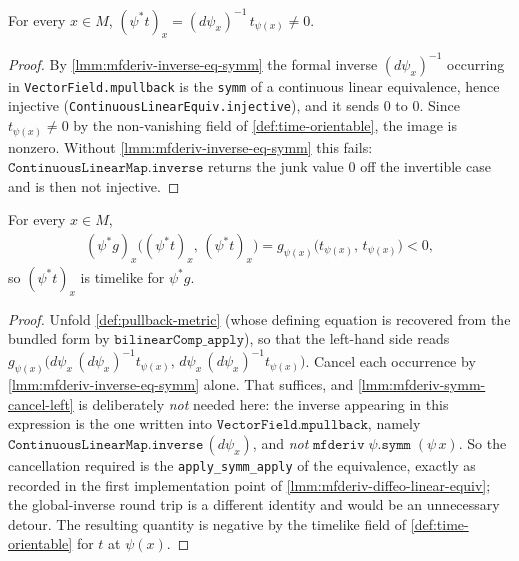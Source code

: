 \begin{lemma}
    \label{lmm:pullback-time-orientation-ne-zero}
    For every $x \in M$, $(\psi^*t)_x = (d\psi_x)^{-1}\,t_{\psi(x)} \neq 0$.
\end{lemma}
\begin{proof}
    By \ref{lmm:mfderiv-inverse-eq-symm} the formal inverse $(d\psi_x)^{-1}$ occurring in \texttt{VectorField.mpullback} is the \texttt{symm} of a continuous linear equivalence, hence injective (\texttt{ContinuousLinearEquiv.injective}), and it sends $0$ to $0$. Since $t_{\psi(x)} \neq 0$ by the non-vanishing field of \ref{def:time-orientable}, the image is nonzero. Without \ref{lmm:mfderiv-inverse-eq-symm} this fails: $\mathtt{ContinuousLinearMap.inverse}$ returns the junk value $0$ off the invertible case and is then not injective.
\end{proof}

\begin{lemma}
    \label{lmm:pullback-time-orientation-timelike}
    For every $x \in M$,
    \begin{align}
        (\psi^*g)_x\big((\psi^*t)_x,\, (\psi^*t)_x\big) = g_{\psi(x)}\big(t_{\psi(x)},\, t_{\psi(x)}\big) < 0,
    \end{align}
    so $(\psi^*t)_x$ is timelike for $\psi^*g$.
\end{lemma}
\begin{proof}
    Unfold \ref{def:pullback-metric} (whose defining equation is recovered from the bundled form by $\mathtt{bilinearComp\_apply}$), so that the left-hand side reads $g_{\psi(x)}\big(d\psi_x\,(d\psi_x)^{-1} t_{\psi(x)},\, d\psi_x\,(d\psi_x)^{-1} t_{\psi(x)}\big)$. Cancel each occurrence by \ref{lmm:mfderiv-inverse-eq-symm} alone. That suffices, and \ref{lmm:mfderiv-symm-cancel-left} is deliberately \emph{not} needed here: the inverse appearing in this expression is the one written into $\mathtt{VectorField.mpullback}$, namely $\mathtt{ContinuousLinearMap.inverse}\,(d\psi_x)$, and \emph{not} $\mathtt{mfderiv}\;\psi.\mathtt{symm}\;(\psi\,x)$. So the cancellation required is the \texttt{apply\_symm\_apply} of the equivalence, exactly as recorded in the first implementation point of \ref{lmm:mfderiv-diffeo-linear-equiv}; the global-inverse round trip is a different identity and would be an unnecessary detour. The resulting quantity is negative by the timelike field of \ref{def:time-orientable} for $t$ at $\psi(x)$.
\end{proof}

